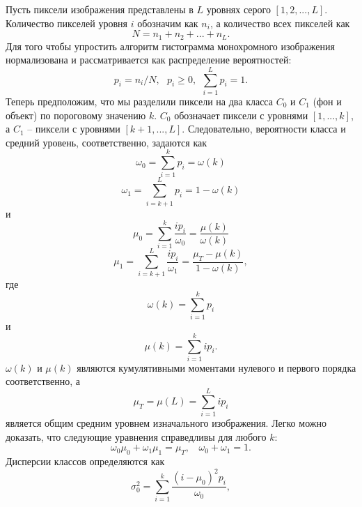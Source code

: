 Пусть пиксели изображения представлены в $L$ уровнях серого 
$[1, 2, ..., L]$. Количество пикселей уровня $i$ обозначим как $n_i$, а
количество всех пикселей как $$N = n_1 + n_2 + ... + n_L.$$ Для того
чтобы упростить алгоритм гистограмма монохромного изображения 
нормализована и рассматривается как распределение вероятностей:
\begin{equation}
	p_i=n_i/N,~~~p_i \geq 0,~~\sum_{i=1}^L{p_i}=1.
	\label{probab}
\end{equation}
Теперь предположим, что мы разделили пиксели на два класса $C_0$ и $C_1$ 
(фон и объект) по пороговому значению $k$. $C_0$ обозначает пиксели с
уровнями $[1, ..., k]$, а $C_1$ -- пиксели с уровнями $[k+1, ..., L]$.
Следовательно, вероятности класса и средний уровень, соответственно,
задаются как
\begin{equation}
	\omega_0=\sum^k_{i=1}{p_i}=\omega(k)
	\label{w_0}
\end{equation}
\begin{equation}
	\omega_1=\sum^L_{i=k+1}{p_i}=1-\omega(k)
	\label{w_1}
\end{equation}
и
\begin{equation}
	\mu_0=\sum^k_{i=1}{\frac{ip_i}{\omega_0}}=\frac{\mu(k)}{\omega(k)}
	\label{mu_0}
\end{equation}
\begin{equation}
	\mu_1=\sum^L_{i=k+1}{\frac{ip_i}{\omega_1}}=\frac{\mu_T-\mu(k)}
	{1-\omega(k)},
	\label{mu_1}
\end{equation}
где
\begin{equation}
	\omega(k)=\sum^k_{i=1}{p_i}
	\label{omega_k}
\end{equation}
и
\begin{equation}
	\mu(k)=\sum^k_{i=1}{ip_i}.
	\label{mu_k}
\end{equation}
$\omega(k)$ и $\mu(k)$ являются кумулятивными моментами нулевого и 
первого порядка соответственно, а
\begin{equation}
	\mu_T=\mu(L)=\sum^L_{i=1}{ip_i}
	\label{mu_T}
\end{equation}
является общим средним уровнем изначального изображения. Легко можно
доказать, что следующие уравнения справедливы для любого $k$:
\begin{equation}
	\omega_0\mu_0+\omega_1\mu_1=\mu_T,~~~~\omega_0+\omega_1=1.
	\label{sum_otsu}
\end{equation} 
Дисперсии классов определяются как
\begin{equation}
	\sigma_0^2=\sum_{i=1}^k{\frac{(i-\mu_0)^2p_i}{\omega_0}},
	\label{disp1}
\end{equation}
